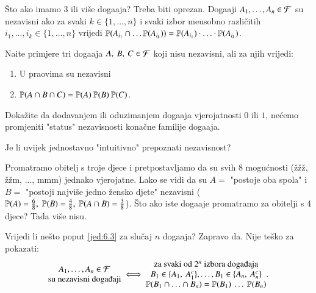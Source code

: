 \v Sto ako imamo 3 ili vi\v se doga\dj aja?
Treba biti oprezan.
Doga\dj aji $A_1, \ldots, A_n \in \mathcal{F}$ su nezavisni ako za svaki $k \in \{1, \ldots, n\}$ i svaki izbor me\dj usobno razli\v citih $i_1, \ldots, i_k \in \{1, \ldots, n\}$ vrijedi $\mathbb{P}({A_{i_1} \cap \ldots \mathbb{P}({A_{i_k}})}) = \mathbb{P}({A_{i_1}}) \cdot \ldots \cdot \mathbb{P}({A_{i_k}})$.

\begin{zad} \label{zad:6.4}
    Na\dj ite primjere tri doga\dj aja $A, \: B, \: C \in \mathcal{F}$ koji nisu nezavisni, ali za njih vrijedi:
    \begin{enumerate}[label=(\roman*)]
        \item U praovima su nezavisni
        \item $\mathbb{P}({A \cap B \cap C}) = \mathbb{P}({A}) \: \mathbb{P}({B}) \: \mathbb{P}({C})$.
    \end{enumerate}
\end{zad}

\begin{zad} \label{zad:6.5}
    Doka\v zite da dodavanjem ili oduzimanjem doga\dj aja vjerojatnosti $0$ ili $1$, ne\' cemo promjeniti "status" nezavisnosti kona\v cne familije doga\dj aja.
\end{zad}

Je li uvijek jednostavno "intuitivno" prepoznati nezavisnost?

\begin{pr}  \label{pr:6.6}
    Promatramo obitelj s troje djece i pretpostavljamo da su svih 8 mogu\' cnosti (\v z\v z\v z, \v z\v zm, ..., mmm) jednako vjerojatne.
    Lako se vidi da su $A =$ "postoje oba spola" i $B = $ "postoji najvi\v se jedno \v zensko djete" nezavisni ($\mathbb{P}({A}) = \frac{6}{8}, \; \mathbb{P}({B}) = \frac{4}{8}, \; \mathbb{P}({A \cap B}) = \frac{3}{8}$).
    \v Sto ako iste doga\dj aje promatramo za obitelji s 4 djece? Tada vi\v se nisu.
\end{pr}

Vrijedi li ne\v sto poput \eqref{jed:6.3} za slu\v caj $n$ doga\dj aja?
Zapravo da. Nije te\v sko za pokazati:
\begin{equation}    \label{jed:6.7}
    \begin{matrix}
        A_1, \ldots, A_n \in \famF\\
        \textnormal{su nezavisni doga\dj aji}
    \end{matrix}
    \iff
    \begin{matrix}
        \textnormal{za svaki od $2^n$ izbora doga\dj aja}\\
        B_1 \in \{A_1, \: A_1^c\}, \ldots, B_1 \in \{A_n, \: A_n^c\}\\
        \vjeroj{B_1 \cap \ldots \cap B_n} = \vjeroj{B_1} \: \ldots \: \vjeroj{B_n}
    \end{matrix}
    .
\end{equation}

